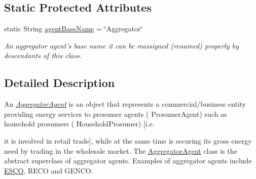 \subsection*{Static Protected Attributes}
\begin{DoxyCompactItemize}
\item 
\hypertarget{classuk_1_1ac_1_1dmu_1_1iesd_1_1cascade_1_1agents_1_1aggregators_1_1_aggregator_agent_abdb619cce17ab13a7db58bf29d3d3689}{static String \hyperlink{classuk_1_1ac_1_1dmu_1_1iesd_1_1cascade_1_1agents_1_1aggregators_1_1_aggregator_agent_abdb619cce17ab13a7db58bf29d3d3689}{agent\-Base\-Name} = \char`\"{}Aggregator\char`\"{}}\label{classuk_1_1ac_1_1dmu_1_1iesd_1_1cascade_1_1agents_1_1aggregators_1_1_aggregator_agent_abdb619cce17ab13a7db58bf29d3d3689}

\begin{DoxyCompactList}\small\item\em An aggregator agent's base name it can be reassigned (renamed) properly by descendants of this class. \end{DoxyCompactList}\end{DoxyCompactItemize}


\subsection{Detailed Description}
An {\itshape \hyperlink{classuk_1_1ac_1_1dmu_1_1iesd_1_1cascade_1_1agents_1_1aggregators_1_1_aggregator_agent}{Aggregator\-Agent}} is an object that represents a commercial/business entity providing energy services to prosumer agents ( {\ttfamily Prosumer\-Agent}) such as household prosumers ( {\ttfamily Household\-Prosumer}) \mbox{[}i.\-e. 

it is involved in retail trade\mbox{]}, while at the same time is securing its gross energy need by trading in the wholesale market. The {\ttfamily \hyperlink{classuk_1_1ac_1_1dmu_1_1iesd_1_1cascade_1_1agents_1_1aggregators_1_1_aggregator_agent}{Aggregator\-Agent}} class is the abstract superclass of aggregator agents. Examples of aggregator agents include \hyperlink{classuk_1_1ac_1_1dmu_1_1iesd_1_1cascade_1_1agents_1_1aggregators_1_1_e_s_c_o}{E\-S\-C\-O}, R\-E\-C\-O and G\-E\-N\-C\-O. 

